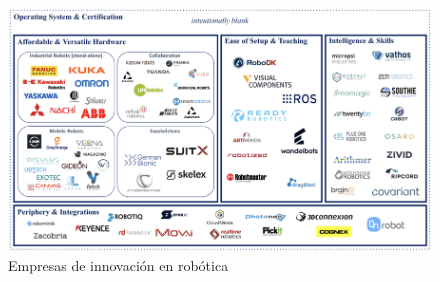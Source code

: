     \newpage
    
    \begin{figure}[H]
        \centering
        \includegraphics[width=0.9\linewidth]{Main/Chapter2/Images2/empresas-robotica.png}
        \caption{Empresas de innovación en robótica}
        \label{f:Cap2_general_empresas_robotica}
    \end{figure}
    
